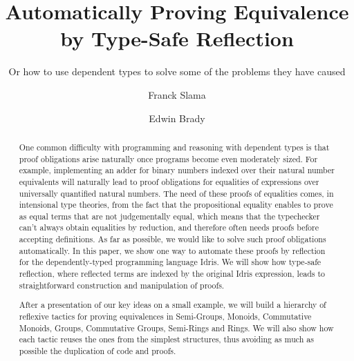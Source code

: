 \documentclass{llncs}
\begin{document}
%
\pagestyle{headings}  %

\mainmatter              %
%
\title{Automatically Proving Equivalence by Type-Safe Reflection}
\subtitle{Or how to use dependent types to solve some of the problems they have caused}
%
%
\author{Franck Slama \and Edwin Brady}

\maketitle              %

\begin{abstract}
One common difficulty with programming and reasoning with dependent types is that proof obligations arise naturally once programs become even moderately sized. For example, implementing an adder for binary numbers indexed over their natural number equivalents will naturally lead to proof obligations for equalities of expressions over universally quantified natural numbers. The need of these proofs of equalities comes, in intensional type theories, from the fact that the propositional equality enables to prove as equal terms that are not judgementally equal, which means that the typechecker can't always obtain equalities by reduction, and therefore often needs proofs before accepting definitions.
As far as possible, we would like to solve such proof obligations automatically. In this paper, we show one way to automate these proofs by reflection for the dependently-typed programming language Idris. We will show how type-safe reflection, where reflected terms are indexed by the original Idris expression, leads to straightforward construction and manipulation of proofs.

After a presentation of our key ideas on a small example, we will build a hierarchy of reflexive tactics for proving equivalences in Semi-Groups, Monoids, Commutative Monoids, Groups, Commutative Groups, Semi-Rings and Rings. We will also show how each tactic reuses the ones from the simplest structures, thus avoiding as much as possible the duplication of code and proofs.
\end{abstract}
%




\end{document}
